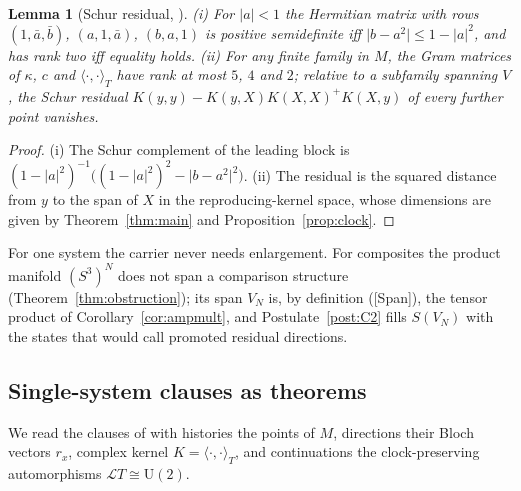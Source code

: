 \documentclass[aps,pra,onecolumn,superscriptaddress,nofootinbib,10pt]{revtex4-2}
\newtheorem{lemma}[theorem]{Lemma}
\theoremstyle{definition}
\theoremstyle{remark}
\newcommand{\cL}{\mathcal{L}}
\newcommand{\ip}[2]{\langle #1,#2\rangle}
\newcommand{\U}{\mathrm{U}}
\begin{document}
\begin{lemma}[Schur residual, {\cite[\S9]{CRQO}}]\label{lem:schur}
(i) For $\lvert a\rvert<1$ the Hermitian matrix with rows $(1,\bar a,\bar b)$, $(a,1,\bar a)$, $(b,a,1)$ is
positive semidefinite iff $\lvert b-a^2\rvert\le1-\lvert a\rvert^2$, and has rank two iff equality holds.
(ii) For any finite family in $M$, the Gram matrices of $\kappa$, $c$ and $\ip{\cdot}{\cdot}_T$ have
rank at most $5$, $4$ and $2$; relative to a subfamily spanning $V$, the Schur residual
$K(y,y)-K(y,X)K(X,X)^+K(X,y)$ of every further point vanishes.
\end{lemma}
\begin{proof}
(i) The Schur complement of the leading block is $(1-\lvert a\rvert^2)^{-1}\bigl((1-\lvert a\rvert^2)^2-\lvert b-a^2\rvert^2\bigr)$.
(ii) The residual is the squared distance from $y$ to the span of $X$ in the reproducing-kernel space,
whose dimensions are given by Theorem~\ref{thm:main} and Proposition~\ref{prop:clock}.
\end{proof}
For one system the carrier never needs enlargement.  For composites the product manifold $(S^3)^N$
does not span a comparison structure (Theorem~\ref{thm:obstruction}); its span $V_N$ is, by definition
([Span]), the tensor product of Corollary~\ref{cor:ampmult}, and Postulate~\ref{post:C2} fills $S(V_N)$ with the states that
\cite{CRQO} would call promoted residual directions.

\subsection{Single-system clauses as theorems}
We read the clauses of \cite{CRQO} with histories the points of $M$, directions their Bloch vectors
$r_x$, complex kernel $K=\ip{\cdot}{\cdot}_T$, and continuations the clock-preserving automorphisms
$\cL T\cong\U(2)$.
\end{document}
